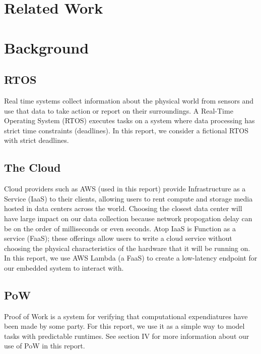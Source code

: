 \documentclass[twoside,twocolumn]{article}
\newcommand{\newp}{\newline\indent}
\begin{document}
\section{Related Work}


\section{Background}

\subsection{RTOS}

Real time systems collect information about the physical world from sensors and use that data to take action or report on their surroundings.
A Real-Time Operating System (RTOS) executes tasks on a system where data processing has strict time constraints (deadlines).
\newp In this report, we consider a fictional RTOS with strict deadlines.

\subsection{The Cloud}

Cloud providers such as AWS (used in this report) provide Infrastructure as a Service (IaaS) to their clients, allowing users to rent compute and storage media hosted in data centers across the world.
Choosing the closest data center will have large impact on our data collection because network propogation delay can be on the order of milliseconds or even seconds.
\newp Atop IaaS is Function as a service (FaaS); these offerings allow users to write a cloud service without choosing the physical characteristics of the hardware that it will be running on.
In this report, we use AWS Lambda (a FaaS) to create a low-latency endpoint for our embedded system to interact with.

\subsection{PoW}

Proof of Work is a system for verifying that computational expendiatures have been made by some party.
For this report, we use it as a simple way to model tasks with predictable runtimes.
\newp See section IV for more information about our use of PoW in this report.
\end{document}
